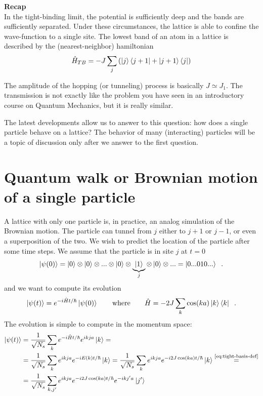 \begin{tcolorbox}
\textbf{Recap}\\

In the tight-binding limit, the potential is sufficiently deep and the bands are sufficiently separated. Under these circumstances, the lattice is able to confine the wave-function to a single site. The lowest band of an atom in a lattice is described by the (nearest-neighbor) hamiltonian
\begin{equation*}
    \hat{H}_{TB} = -J\sum_j
    \left( \ket{j}\bra{j+1} + \ket{j+1}\bra{j}\right)
\end{equation*}

The amplitude of the hopping (or tunneling) process is basically $J\simeq J_1$. The transmission is not exactly like the problem you have seen in an introductory course on Quantum Mechanics, but it is really similar.

\begin{center}
    \scalebox{1.2}{  }
\end{center}

\end{tcolorbox}


The latest developments allow us to answer to this question: how does a single particle behave on a lattice? The behavior of many (interacting) particles will be a topic of discussion only after we answer to the first question.




\section{Quantum walk or Brownian motion of a single particle}

A lattice with only one particle is, in practice, an analog simulation of the Brownian motion.
The particle can tunnel from $j$ either to $j+1$ or $j-1$, or even a superposition of the two. We wish to predict the location of the particle after some time steps.
%
We assume that the particle is in site $j$ at $t=0$ $$\ket{\psi(0)} = \ket{0}\otimes\ket{0}\otimes...\otimes \ket{0}\otimes\underbrace{\ket{1}}_{j}\otimes\ket{0} \otimes ... = \ket{0...010...} \;\;.$$
and we want to compute its evolution
$$\ket{\psi(t)} = e^{-i\hat{H}t/\hbar}\ket{\psi(0)} \qquad \text{where}\qquad \hat{H} = -2J\sum_k\cos(ka)\ket{k}\bra{k} \;\;.$$
%
The evolution is simple to compute in the momentum space:
\begin{align*}
    \ket{\psi(t)} &= \frac{1}{\sqrt{N_s}} \sum_k e^{-i\hat{H}t/\hbar} e^{ikja} \ket{k} = \\
    &= \frac{1}{\sqrt{N_s}} \sum_k e^{ikja} e^{-iE(k)t/\hbar} \ket{k}
    = \frac{1}{\sqrt{N_s}} \sum_k e^{ikja} e^{-i2J\cos(ka)t/\hbar} \ket{k} \overset{\text{\ref{eq:tight-basis-def}}}{=}\\ %
    &= \frac{1}{\sqrt{N_s}} \sum_{k,j'} e^{ikja} e^{-i2J\cos(ka)t/\hbar} e^{-ikj'a} \ket{j'}
\end{align*}

